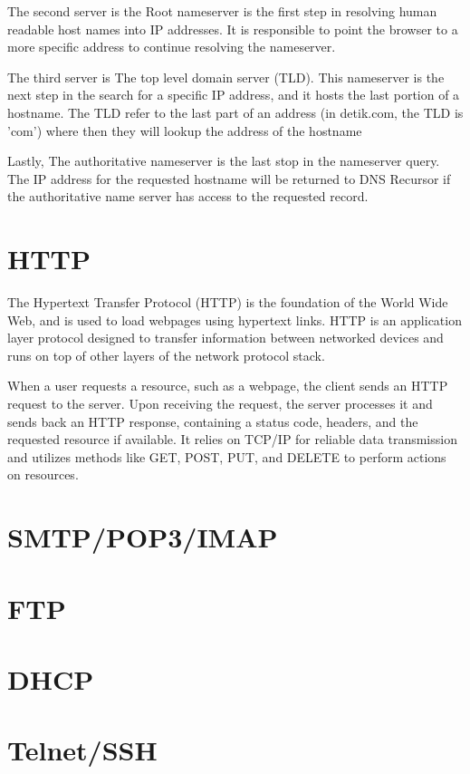 \documentclass[12pt,titlepage]{article}
\begin{document}
The second server is the Root nameserver is the first step in resolving human readable host names into IP addresses. It is responsible to point the browser to a more specific address to continue resolving the nameserver.

The third server is The top level domain server (TLD). This nameserver is the next step in the search for a specific IP address, and it hosts the last portion of a hostname. The TLD refer to the last part of an address (in detik.com, the TLD is 'com') where then they will lookup the address of the hostname

Lastly, The authoritative nameserver is the last stop in the nameserver query. The IP address for the requested hostname will be returned to DNS Recursor if the authoritative name server has access to the requested record.

\section{HTTP}
The Hypertext Transfer Protocol (HTTP) is the foundation of the World Wide Web, and is used to load webpages using hypertext links. HTTP is an application layer protocol designed to transfer information between networked devices and runs on top of other layers of the network protocol stack.

When a user requests a resource, such as a webpage, the client sends an HTTP request to the server. Upon receiving the request, the server processes it and sends back an HTTP response, containing a status code, headers, and the requested resource if available. It relies on TCP/IP for reliable data transmission and utilizes methods like GET, POST, PUT, and DELETE to perform actions on resources.

\section{SMTP/POP3/IMAP}

\section{FTP}

\section{DHCP}

\section{Telnet/SSH}
\end{document}
